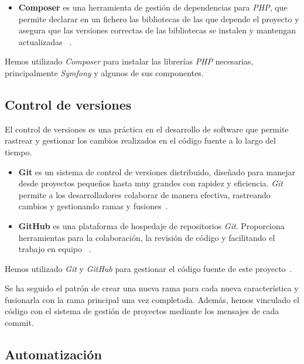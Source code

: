 \begin{itemize}
    \item
    \textbf{Composer} es una herramienta de gestión de dependencias para \textit{PHP}, que permite declarar en un
    fichero las bibliotecas de las que depende el proyecto y asegura que las versiones correctas de las bibliotecas se
    instalen y mantengan actualizadas ~\cite{url_composer}.
\end{itemize}

Hemos utilizado  \textit{Composer} para instalar las librerías  \textit{PHP} necesarias, principalmente
\textit{Symfony} y algunos de sus componentes.

\subsection*{Control de versiones}

El control de versiones es una práctica en el desarrollo de software que permite rastrear y gestionar los cambios
realizados en el código fuente a lo largo del tiempo.

\begin{itemize}
    \item
    \textbf{Git} es un sistema de control de versiones distribuido, diseñado para manejar desde proyectos pequeños
    hasta muy grandes con rapidez y eficiencia.
    \textit{Git} permite a los desarrolladores colaborar de manera efectiva, rastreando cambios y gestionando ramas y
    fusiones~\cite{url_git}.

    \item
    \textbf{GitHub} es una plataforma de hospedaje de repositorios \textit{Git}.
    Proporciona herramientas para la colaboración, la revisión de código y facilitando el trabajo en equipo
    ~\cite{url_github}.
\end{itemize}

Hemos utilizado \textit{Git} y \textit{GitHub} para gestionar el código fuente de este
proyecto~\cite{url_viu_84_proyecto}.

Se ha seguido el patrón de crear una nueva rama para cada nueva característica y fusionarla con la rama principal una
vez completada.
Además, hemos vinculado el código con el sistema de gestión de proyectos mediante los mensajes de cada commit.


\subsection*{Automatización}

